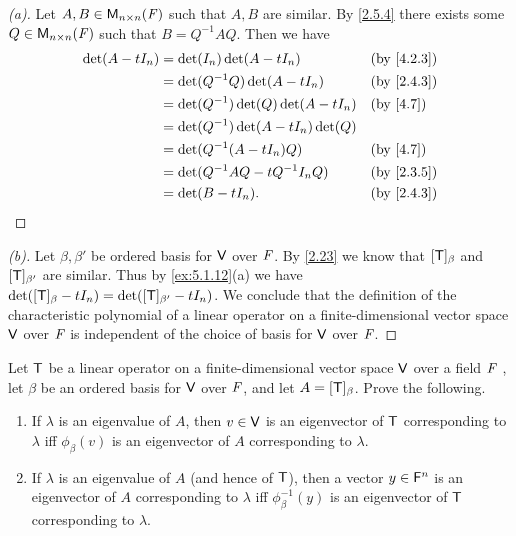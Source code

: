 \begin{proof}[(a)]
  Let \(A, B \in \ms[n][n][\F]\) such that \(A, B\) are similar.
  By \cref{2.5.4} there exists some \(Q \in \ms[n][n][\F]\) such that \(B = Q^{-1} A Q\).
  Then we have
  \begin{align*}
    \det(A - t I_n) & = \det(I_n) \det(A - t I_n)            &  & \by{4.2.3} \\
                    & = \det(Q^{-1} Q) \det(A - t I_n)       &  & \by{2.4.3} \\
                    & = \det(Q^{-1}) \det(Q) \det(A - t I_n) &  & \by{4.7}   \\
                    & = \det(Q^{-1}) \det(A - t I_n) \det(Q)                 \\
                    & = \det(Q^{-1} (A - t I_n) Q)           &  & \by{4.7}   \\
                    & = \det(Q^{-1} A Q - t Q^{-1} I_n Q)    &  & \by{2.3.5} \\
                    & = \det(B - t I_n).                     &  & \by{2.4.3}
  \end{align*}
\end{proof}

\begin{proof}[(b)]
  Let \(\beta, \beta'\) be ordered basis for \(\mathsf{V}\) over \(\mathit{F}\).
  By \cref{2.23} we know that \([\mathsf{T}]_{\beta}\) and \([\mathsf{T}]_{\beta'}\) are similar.
  Thus by \cref{ex:5.1.12}(a) we have \(\det([\mathsf{T}]_{\beta} - t I_n) = \det([\mathsf{T}]_{\beta'} - t I_n)\).
  We conclude that the definition of the characteristic polynomial of a linear operator on a finite-dimensional vector space \(\mathsf{V}\) over \(\mathit{F}\) is independent of the choice of basis for \(\mathsf{V}\) over \(\mathit{F}\).
\end{proof}

\begin{ex}\label{ex:5.1.13}
  Let \(\mathsf{T}\) be a linear operator on a finite-dimensional vector space \(\mathsf{V}\) over a field \(\mathit{F}\) , let \(\beta\) be an ordered basis for \(\mathsf{V}\) over \(\mathit{F}\), and let \(A = [\mathsf{T}]_{\beta}\).
  Prove the following.
  \begin{enumerate}
    \item If \(\lambda\) is an eigenvalue of \(A\), then \(v \in \mathsf{V}\) is an eigenvector of \(\mathsf{T}\) corresponding to \(\lambda\) iff \(\phi_{\beta}(v)\) is an eigenvector of \(A\) corresponding to \(\lambda\).
    \item If \(\lambda\) is an eigenvalue of \(A\) (and hence of \(\mathsf{T}\)), then a vector \(y \in \mathsf{F}^n\) is an eigenvector of \(A\) corresponding to \(\lambda\) iff \(\phi_{\beta}^{-1}(y)\) is an eigenvector of \(\mathsf{T}\) corresponding to \(\lambda\).
  \end{enumerate}
\end{ex}

